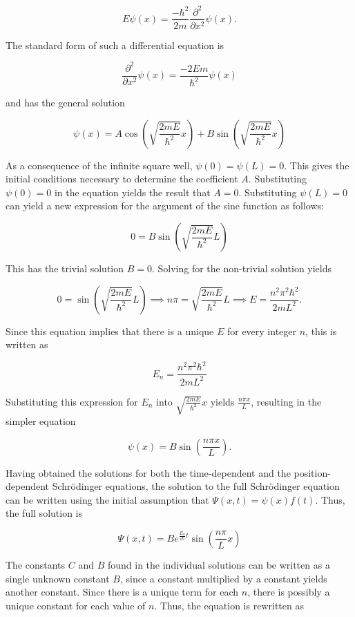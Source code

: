 \documentclass[11pt]{article}
\begin{document}
$$
E\psi(x) = \frac{-\hbar^2}{2m}\frac{\partial^2}{\partial x^2}\psi(x).
$$

\noindent The standard form of such a differential equation is

$$
\frac{\partial^2}{\partial x^2}\psi(x) = \frac{-2Em}{\hbar^2}\psi(x)
$$

\noindent and has the general solution

$$
\psi(x) = A\cos\left(\sqrt{\frac{2mE}{\hbar^2}}x\right) + B\sin\left(\sqrt{\frac{2mE}{\hbar^2}}x\right)
$$

As a consequence of the infinite square well, $\psi(0)=\psi(L)=0$. This gives the initial conditions necessary to determine the coefficient $A$. Substituting $\psi(0)=0$ in the equation yields the result that $A=0$. Substituting $\psi(L)=0$ can yield a new expression for the argument of the sine function as follows:

$$
0=B\sin\left(\sqrt{\frac{2mE}{\hbar^2}}L\right)
$$

\noindent This has the trivial solution $B=0$. Solving for the non-trivial solution yields

$$
0=\sin\left(\sqrt{\frac{2mE}{\hbar^2}}L\right)
\implies
n \pi = \sqrt{\frac{2mE}{\hbar^2}}L
\implies
E = \frac{n^2 \pi^2 \hbar^2}{2mL^2}.
$$


\noindent Since this equation implies that there is a unique $E$ for every integer $n$, this is written as

$$
E_n = \frac{n^2 \pi^2 \hbar^2}{2mL^2}
$$

\noindent Substituting this expression for $E_n$ into $\sqrt{\frac{2mE}{\hbar^2}}x$ yields $\frac{n \pi x}{L}$, resulting in the simpler equation

$$
\psi(x) = B\sin\left(\frac{n \pi x}{L}\right).
$$

Having obtained the solutions for both the time-dependent and the position-dependent Schr\"odinger equations, the solution to the full Schr\"odinger equation can be written using the initial assumption that $\Psi(x,t)=\psi(x)f(t)$. Thus, the full solution is

$$
\Psi(x,t) = B e^{\frac{E_n}{i\hbar}t} \sin\left(\frac{n \pi}{L}x\right)
$$

\noindent The constants $C$ and $B$ found in the individual solutions can be written as a single unknown constant $B$, since a constant multiplied by a constant yields another constant. Since there is a unique term for each $n$, there is possibly a unique constant for each value of $n$. Thus, the equation is rewritten as
\end{document}
